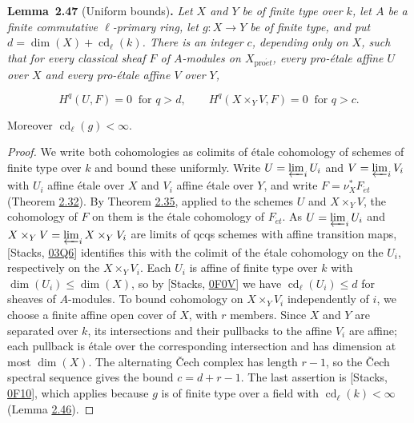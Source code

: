 \documentclass[11pt]{article}
\newenvironment{bpstatement}[2]{\par\addvspace{0.6\baselineskip}\noindent\textbf{#1}#2\textbf{.}\enspace\ignorespaces}
  {\par\addvspace{0.4\baselineskip}}
\newenvironment{bpstatementit}[2]{\begin{bpstatement}{#1}{#2}\itshape\ignorespaces}{\end{bpstatement}}
\begin{document}
\label{bp142}%
\begin{bpstatementit}{Lemma~2.47}{ (Uniform bounds)}
Let \(X\) and \(Y\) be of finite type over \(k\), let \(A\) be a finite commutative \(\ell\)-primary ring, let \(g:X\to Y\) be of finite type, and put \(d=\dim(X)+\operatorname{cd}_\ell(k)\). There is an integer \(c\), depending only on \(X\), such that for every classical sheaf \(F\) of \(A\)-modules on \(X_{\mathrm{pro}\acute{e}t}\), every pro-étale affine \(U\) over \(X\) and every pro-étale affine \(V\) over \(Y\),

\[
H^q(U,F)=0\ \text{ for }q>d,
\qquad
H^q(X\times_YV,F)=0\ \text{ for }q>c.
\]

Moreover \(\operatorname{cd}_\ell(g)<\infty\).
\end{bpstatementit}

\begin{proof}[{Proof}]\label{bp143}%
We write both cohomologies as colimits of étale cohomology of schemes of finite type over \(k\) and bound these uniformly. Write \(U=\varprojlim_iU_i\) and \(V=\varprojlim_iV_i\) with \(U_i\) affine étale over \(X\) and \(V_i\) affine étale over \(Y\), and write \(F=\nu_X^*F_{\acute{e}t}\) (Theorem \hyperref[bp95]{2.32}). By Theorem \hyperref[bp103]{2.35}, applied to the schemes \(U\) and \(X\times_YV\), the cohomology of \(F\) on them is the étale cohomology of \(F_{\acute{e}t}\). As \(U=\varprojlim_iU_i\) and \(X\times_YV=\varprojlim_iX\times_YV_i\) are limits of qcqs schemes with affine transition maps, [Stacks, \href{https://stacks.math.columbia.edu/tag/03Q6}{03Q6}] identifies this with the colimit of the étale cohomology on the \(U_i\), respectively on the \(X\times_YV_i\). Each \(U_i\) is affine of finite type over \(k\) with \(\dim(U_i)\leq\dim(X)\), so by [Stacks, \href{https://stacks.math.columbia.edu/tag/0F0V}{0F0V}] we have \(\operatorname{cd}_\ell(U_i)\leq d\) for sheaves of \(A\)-modules. To bound cohomology on \(X\times_YV_i\) independently of \(i\), we choose a finite affine open cover of \(X\), with \(r\) members. Since \(X\) and \(Y\) are separated over \(k\), its intersections and their pullbacks to the affine \(V_i\) are affine; each pullback is étale over the corresponding intersection and has dimension at most \(\dim(X)\). The alternating Čech complex has length \(r-1\), so the Čech spectral sequence gives the bound \(c=d+r-1\). The last assertion is [Stacks, \href{https://stacks.math.columbia.edu/tag/0F10}{0F10}], which applies because \(g\) is of finite type over a field with \(\operatorname{cd}_\ell(k)<\infty\) (Lemma \hyperref[bp139]{2.46}).
\end{proof}
\end{document}
